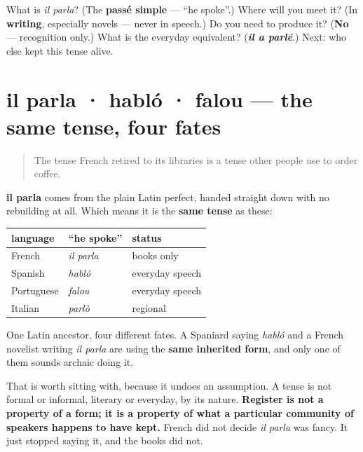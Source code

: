 \begin{tcolorbox}[breakable,colback=teal!4,colframe=teal!35!black,title={Before you move on}]
What is \emph{il parla}? (The \textbf{passé simple} — \textquotedblleft{}he spoke\textquotedblright{}.) Where will you meet it? (In \textbf{writing}, especially novels — never in speech.) Do you need to produce it? (\textbf{No} — recognition only.) What is the everyday equivalent? (\emph{\textbf{il a parlé}}.) Next: who else kept this tense alive.
\end{tcolorbox}
\section[il parla · habló · falou]{il parla · habló · falou — the same tense, four fates}

\label{lesson:FR-C15-soeurs}



\begin{quote}
The tense French retired to its libraries is a tense other people use to order coffee.
\end{quote}

\begin{cousinweb}
\textbf{il parla} comes from the plain Latin perfect, handed straight down with no rebuilding at all. Which means it is the \textbf{same tense} as these:

\noindent
\begin{tabularx}{\linewidth}{@{}>{\raggedright\arraybackslash}X>{\raggedright\arraybackslash}X>{\raggedright\arraybackslash}X@{}}
\toprule
\textbf{language} & \textbf{\textquotedblleft{}he spoke\textquotedblright{}} & \textbf{status} \\
\midrule
French & \emph{il parla} & books only \\
Spanish & \emph{habló} & everyday speech \\
Portuguese & \emph{falou} & everyday speech \\
Italian & \emph{parlò} & regional \\
\bottomrule
\end{tabularx}

One Latin ancestor, four different fates. A Spaniard saying \emph{habló} and a French novelist writing \emph{il parla} are using the \textbf{same inherited form}, and only one of them sounds archaic doing it.

That is worth sitting with, because it undoes an assumption. A tense is not formal or informal, literary or everyday, by its nature. \textbf{Register is not a property of a form; it is a property of what a particular community of speakers happens to have kept.} French did not decide \emph{il parla} was fancy. It just stopped saying it, and the books did not.
\end{cousinweb}


